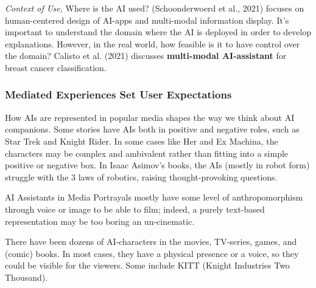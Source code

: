 \documentclass[
  letterpaper,
  DIV=11,
  numbers=noendperiod]{scrartcl}
\begin{document}
\emph{Context of Use,} Where is the AI used? (Schoonderwoerd et al.,
2021) focuses on human-centered design of AI-apps and multi-modal
information display. It's important to understand the domain where the
AI is deployed in order to develop explanations. However, in the real
world, how feasible is it to have control over the domain? Calisto et
al. (2021) discusses \textbf{multi-modal AI-assistant} for breast cancer
classification.

\subsubsection{Mediated Experiences Set User
Expectations}\label{mediated-experiences-set-user-expectations}

How AIs are represented in popular media shapes the way we think about
AI companions. Some stories have AIs both in positive and negative
roles, such as Star Trek and Knight Rider. In some cases like Her and Ex
Machina, the characters may be complex and ambivalent rather than
fitting into a simple positive or negative box. In Isaac Asimov's books,
the AIs (mostly in robot form) struggle with the 3 laws of robotics,
raising thought-provoking questions.

AI Assistants in Media Portrayals mostly have some level of
anthropomorphism through voice or image to be able to film; indeed, a
purely text-based representation may be too boring an un-cinematic.

There have been dozens of AI-characters in the movies, TV-series, games,
and (comic) books. In most cases, they have a physical presence or a
voice, so they could be visible for the viewers. Some include KITT
(Knight Industries Two Thousand).
\end{document}
